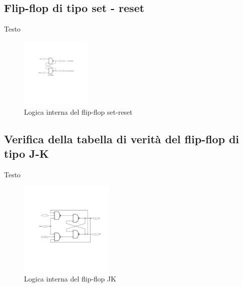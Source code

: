 \documentclass[journal]{IEEEtran}
\begin{document}
\subsection{Flip-flop di tipo set - reset}
Testo

\begin{figure}[H]%
\begin{center}
\includegraphics[width=0.30\textwidth]{sch-simulations/digital/output/flip-flop-RS.pdf}
\caption{Logica interna del flip-flop set-reset}
\label{fig:circuit_flip_flop}
\end{center}
\end{figure}



\subsection{Verifica della tabella di verità del flip-flop di tipo J-K}
Testo

\begin{figure}[H]%
\centering
\begin{center}
\includegraphics[width=0.40\textwidth]{sch-simulations/digital/output/flip-flop-JK.pdf}
\end{center}
\caption{Logica interna del flip-flop JK}
\label{fig:circuit_JK}
\end{figure}

\end{document}
